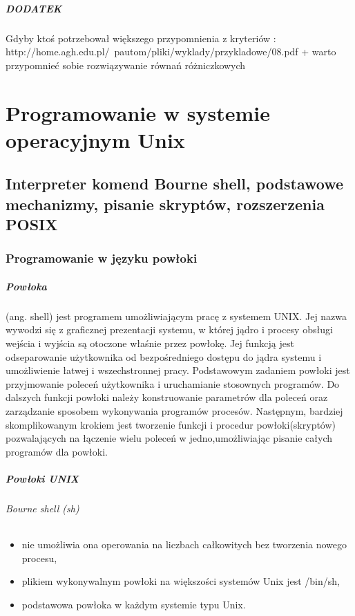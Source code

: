 \documentclass[a4paper,twoside]{report}
\begin{document}
\paragraph{DODATEK}
Gdyby ktoś potrzebował większego przypomnienia z kryteriów : http://home.agh.edu.pl/~pautom/pliki/wyklady/przykladowe/08.pdf
+ warto przypomnieć sobie rozwiązywanie równań różniczkowych


\chapter{Programowanie w systemie operacyjnym Unix}

\section{Interpreter komend Bourne shell, podstawowe mechanizmy, pisanie skryptów, rozszerzenia POSIX }





\subsection{Programowanie w języku powłoki}

\paragraph{Powłoka} (ang. shell) jest programem umożliwiającym pracę z systemem   UNIX. Jej nazwa wywodzi się z graficznej prezentacji systemu, w której jądro i procesy obsługi wejścia i wyjścia są otoczone właśnie przez powłokę. Jej funkcją jest odseparowanie użytkownika od bezpośredniego dostępu do jądra systemu i umożliwienie   łatwej i wszechstronnej pracy. Podstawowym zadaniem powłoki jest przyjmowanie     poleceń użytkownika i uruchamianie stosownych programów. Do dalszych funkcji powłoki należy konstruowanie parametrów dla poleceń oraz zarządzanie sposobem wykonywania programów procesów. Następnym, bardziej skomplikowanym krokiem jest tworzenie   funkcji i procedur powłoki(skryptów) pozwalających   na łączenie wielu   poleceń  w   jedno,umożliwiając pisanie całych programów dla powłoki.
\paragraph{Powłoki UNIX}

\subparagraph{Bourne shell (sh)}

\begin{itemize}
	\item nie umożliwia ona operowania na liczbach całkowitych bez tworzenia nowego procesu,
	\item plikiem wykonywalnym powłoki na większości systemów Unix jest /bin/sh,
	\item  podstawowa powłoka w każdym systemie typu Unix.
\end{itemize}
\end{document}
